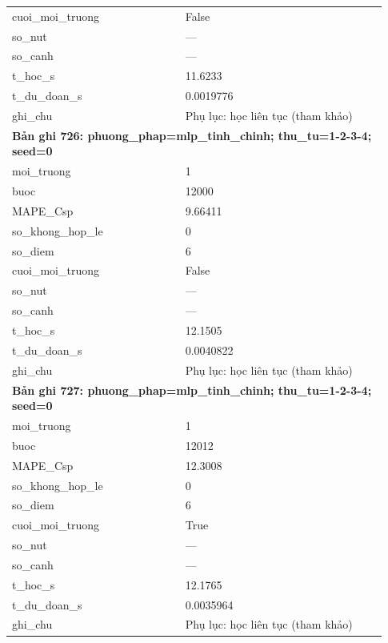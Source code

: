 \begin{longtable}{p{0.43\linewidth}p{0.50\linewidth}}
cuoi\_\allowbreak moi\_\allowbreak truong & False \\
so\_\allowbreak nut & — \\
so\_\allowbreak canh & — \\
t\_\allowbreak hoc\_\allowbreak s & 11.6233 \\
t\_\allowbreak du\_\allowbreak doan\_\allowbreak s & 0.0019776 \\
ghi\_\allowbreak chu & Phụ lục: học liên tục (tham khảo) \\
\midrule
\multicolumn{2}{p{0.95\linewidth}}{\textbf{Bản ghi 726: phuong\_phap=mlp\_tinh\_chinh; thu\_tu=1-2-3-4; seed=0}} \\
moi\_\allowbreak truong & 1 \\
buoc & 12000 \\
MAPE\_\allowbreak Csp & 9.66411 \\
so\_\allowbreak khong\_\allowbreak hop\_\allowbreak le & 0 \\
so\_\allowbreak diem & 6 \\
cuoi\_\allowbreak moi\_\allowbreak truong & False \\
so\_\allowbreak nut & — \\
so\_\allowbreak canh & — \\
t\_\allowbreak hoc\_\allowbreak s & 12.1505 \\
t\_\allowbreak du\_\allowbreak doan\_\allowbreak s & 0.0040822 \\
ghi\_\allowbreak chu & Phụ lục: học liên tục (tham khảo) \\
\midrule
\multicolumn{2}{p{0.95\linewidth}}{\textbf{Bản ghi 727: phuong\_phap=mlp\_tinh\_chinh; thu\_tu=1-2-3-4; seed=0}} \\
moi\_\allowbreak truong & 1 \\
buoc & 12012 \\
MAPE\_\allowbreak Csp & 12.3008 \\
so\_\allowbreak khong\_\allowbreak hop\_\allowbreak le & 0 \\
so\_\allowbreak diem & 6 \\
cuoi\_\allowbreak moi\_\allowbreak truong & True \\
so\_\allowbreak nut & — \\
so\_\allowbreak canh & — \\
t\_\allowbreak hoc\_\allowbreak s & 12.1765 \\
t\_\allowbreak du\_\allowbreak doan\_\allowbreak s & 0.0035964 \\
ghi\_\allowbreak chu & Phụ lục: học liên tục (tham khảo) \\

\end{longtable}
